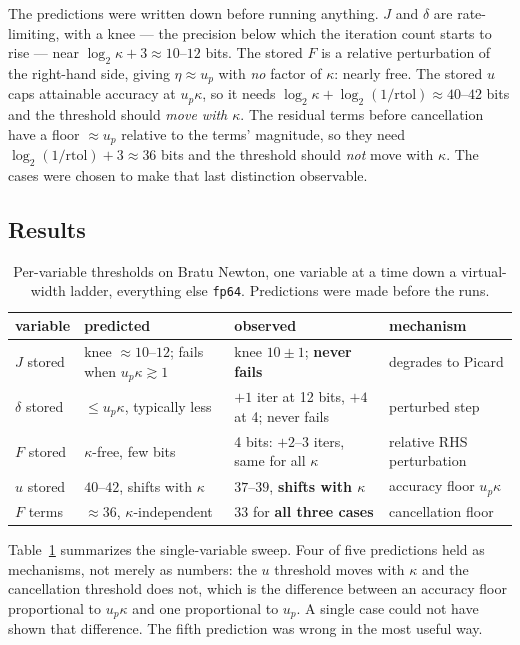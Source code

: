 \documentclass[11pt]{article}
\begin{document}
The predictions were written down before running anything. $J$ and $\delta$ are
rate-limiting, with a knee --- the precision below which the iteration count
starts to rise --- near $\log_2 \kappa + 3 \approx 10$--$12$ bits. The stored $F$
is a relative perturbation of the right-hand side, giving $\eta \approx u_p$
with \emph{no} factor of $\kappa$: nearly free. The stored $u$ caps attainable
accuracy at
$u_p\kappa$, so it needs $\log_2\kappa + \log_2(1/\mathrm{rtol}) \approx 40$--$42$
bits and the threshold should \emph{move with $\kappa$}. The residual terms
before cancellation have a floor $\approx u_p$ relative to the terms' magnitude,
so they need $\log_2(1/\mathrm{rtol}) + 3 \approx 36$ bits and the threshold
should \emph{not} move with $\kappa$. The cases were chosen to make that last
distinction observable.

\subsection{Results}

\begin{table}[t]
\centering\small
\begin{tabular}{@{}llll@{}}
\toprule
variable & predicted & observed & mechanism\\
\midrule
$J$ stored & knee $\approx 10$--$12$; fails when $u_p\kappa \gtrsim 1$ & knee $10\pm1$; \textbf{never fails} & degrades to Picard\\
$\delta$ stored & $\le u_p\kappa$, typically less & $+1$ iter at 12 bits, $+4$ at 4; never fails & perturbed step\\
$F$ stored & $\kappa$-free, few bits & 4 bits: $+2$--$3$ iters, same for all $\kappa$ & relative RHS perturbation\\
$u$ stored & $40$--$42$, shifts with $\kappa$ & $37$--$39$, \textbf{shifts with $\kappa$} & accuracy floor $u_p\kappa$\\
$F$ terms & $\approx 36$, $\kappa$-independent & $33$ for \textbf{all three cases} & cancellation floor\\
\bottomrule
\end{tabular}
\caption{Per-variable thresholds on Bratu Newton, one variable at a time down a
virtual-width ladder, everything else \texttt{fp64}. Predictions were made
before the runs.}
\label{tab:bratu-thresholds}
\end{table}

Table~\ref{tab:bratu-thresholds} summarizes the single-variable sweep. Four of
five predictions held as mechanisms, not merely as numbers: the $u$ threshold
moves with $\kappa$ and the cancellation threshold does not, which is the
difference between an accuracy floor proportional to $u_p\kappa$ and one
proportional to $u_p$. A single case could not have shown that difference. The
fifth prediction was wrong in the most useful way.
\end{document}
